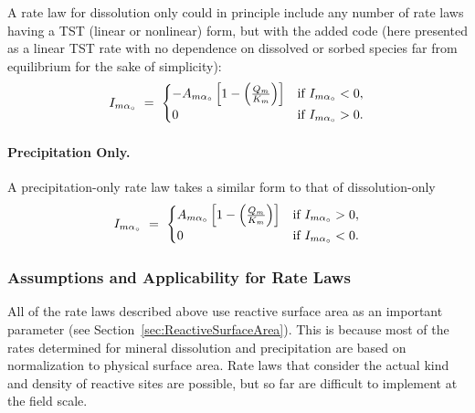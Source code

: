 A rate law for dissolution only could in principle include any number of rate laws
having a TST (linear or nonlinear) form, but with the added code (here presented as a linear TST rate with no dependence on dissolved or sorbed species far from equilibrium for the sake of simplicity):
\begin{eqnarray}
I_{m{\alpha}_\circ} \ =\ 
  \begin{cases}
   -A_{m{\alpha}_\circ} \mathop{\left[1-\mathop{\left(\frac{Q_{m} }{K_{m} } \right)} \right]} & \text{if $I_{m{\alpha}_\circ} < 0$},\\
   0 & \text{if $I_{m{\alpha}_\circ} > 0$}.
  \end{cases}
\end{eqnarray}


\paragraph{Precipitation Only.}

A precipitation-only rate law takes a similar form to that of dissolution-only
\begin{eqnarray}
I_{m{\alpha}_\circ} \ =\ 
  \begin{cases}
   A_{m{\alpha}_\circ} \mathop{\left[1-\mathop{\left(\frac{Q_{m} }{K_{m} } \right)} \right]} & \text{if $I_{m{\alpha}_\circ} > 0$},\\
   0 & \text{if $I_{m{\alpha}_\circ} < 0$}.
  \end{cases}
\end{eqnarray}

\subsubsection{Assumptions and Applicability for Rate Laws}

All of the rate laws described above use reactive surface area as an important parameter (see Section~\ref{sec:ReactiveSurfaceArea}).  This is because most of the rates determined for mineral dissolution and precipitation are based on normalization to physical surface area.  Rate laws that consider the actual kind and density of reactive sites are possible, but so far are difficult to implement at the field scale.

